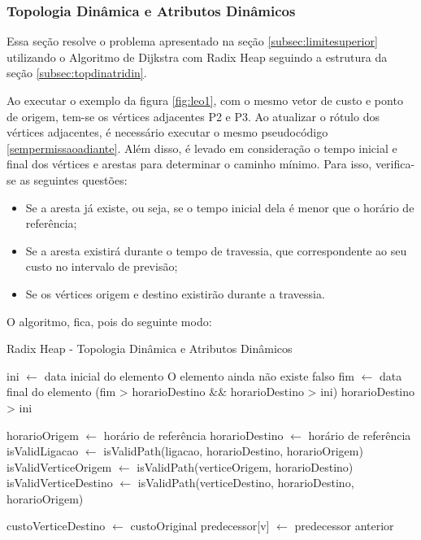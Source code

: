 \subsubsection{Topologia Dinâmica e Atributos Dinâmicos}
Essa seção resolve o problema apresentado na seção \ref{subsec:limitesuperior} utilizando o Algoritmo de
Dijkstra com Radix Heap seguindo a estrutura da seção \ref{subsec:topdinatridin}.

Ao executar o exemplo da figura \ref{fig:leo1}, com o mesmo vetor de custo e ponto de origem, tem-se
os vértices adjacentes P2 e P3. Ao atualizar o rótulo dos vértices adjacentes, é necessário executar o mesmo
pseudocódigo \ref{sempermissaoadiante}. Além disso, é levado em consideração o tempo
inicial e final dos vértices e arestas para determinar o caminho mínimo. Para isso,
verifica-se as seguintes questões:
\begin{itemize}
\item Se a aresta já existe, ou seja, se o tempo inicial dela é menor que o horário de referência;
\item Se a aresta existirá durante o tempo de travessia, que correspondente ao seu custo no intervalo de previsão;
\item Se os vértices origem e destino existirão durante a travessia.
\end{itemize}
\FloatBarrier

O algoritmo, fica, pois do seguinte modo:

\begin{algorithm}
\caption{Radix Heap - Topologia Dinâmica e Atributos Dinâmicos}
\begin{algorithmic}[1]
\State ini $\leftarrow$ data inicial do elemento
  \State O elemento ainda não existe \Return falso
\EndIf
{}
  \State fim $\leftarrow$ data final do elemento
  \State\Return (fim > horarioDestino $\&\&$ horarioDestino > ini)
\EndIf
\State\Return horarioDestino > ini
\EndFunction

\State horarioOrigem $\leftarrow$ horário de referência
\State horarioDestino $\leftarrow$ horário de referência
\State isValidLigacao $\leftarrow$ isValidPath(ligacao, horarioDestino, horarioOrigem)
\State isValidVerticeOrigem $\leftarrow$ isValidPath(verticeOrigem, horarioDestino)
\State isValidVerticeDestino $\leftarrow$ isValidPath(verticeDestino, horarioDestino, horarioOrigem)

  \State custoVerticeDestino $\leftarrow$ custoOriginal
  \State predecessor[v] $\leftarrow$ predecessor anterior
\EndIf
\end{algorithmic}
\label{algtudodinamico}
\end{algorithm}
\FloatBarrier

